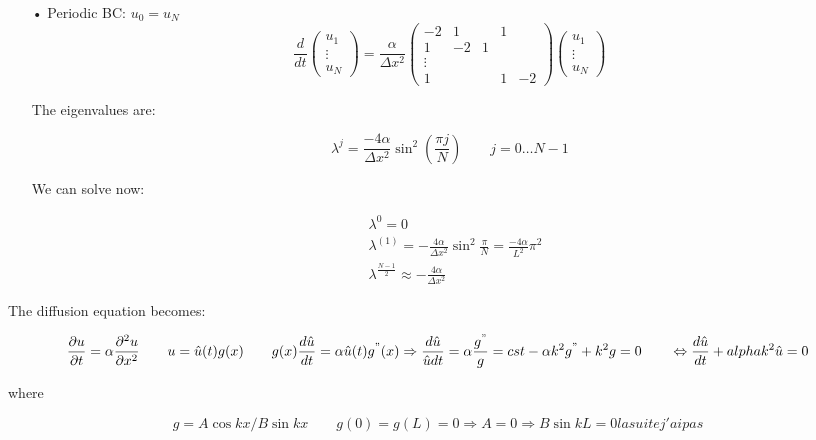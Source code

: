 \begin{itemize}
\item[•] Periodic BC: $u_0 = u_N$
\begin{equation}
\frac{d}{dt} \left(\begin{array}{c}
u_1\\
\vdots\\
u_N
\end{array} \right) = \frac{\alpha }{\Delta x^2}
\left(
\begin{array}{ccccc}
-2 & 1 & & 1 \\
1 & -2 & 1 & & \\
\vdots\\
1 & & & 1 & -2
\end{array}
\right)\left(\begin{array}{c}
u_1\\
\vdots\\
u_N
\end{array} \right)
\end{equation}

The eigenvalues are: 

\begin{equation}
\lambda ^{j} = \frac{-4\alpha}{\Delta x^2}\sin ^2 \left( \frac{\pi j}{N} \right) \qquad j = 0 \dots N-1
\end{equation}

We can solve now: 

\begin{equation}
\begin{aligned}
&\lambda ^{0} = 0\\
&\lambda ^{(1)} = -\frac{4\alpha}{\Delta x^2} \sin ^2 \frac{\pi }{ N}=\frac{-4 \alpha}{L^2}\pi ^2\\
&\lambda ^{\frac{N-1}{2}} \approx -\frac{4\alpha}{\Delta x^2}
\end{aligned}
\end{equation}
\end{itemize}

The diffusion equation becomes: 

\begin{equation}
\frac{\partial u}{\partial t} = \alpha \frac{\partial ^2 u}{\partial x^2} \qquad u = \hat{u}(t)g(x) \qquad g(x) \frac{d \hat{u}}{d t} = \alpha \hat{u}(t)g^"(x)\Rightarrow \frac{d\hat{u}}{\hat{u}dt} = \alpha \frac{g^"}{g}= cst - \alpha k^2 g^" + k^2 g = 0 \qquad \Leftrightarrow \frac{d \hat{u}}{dt} + alpha k^2 \hat{u} = 0
\end{equation}

where 

\begin{equation}
g = A \cos k x / B \sin kx \qquad g(0) = g(L) = 0 \Rightarrow A = 0 \Rightarrow B\sin kL = 0 la suite j'ai pas
\end{equation}

